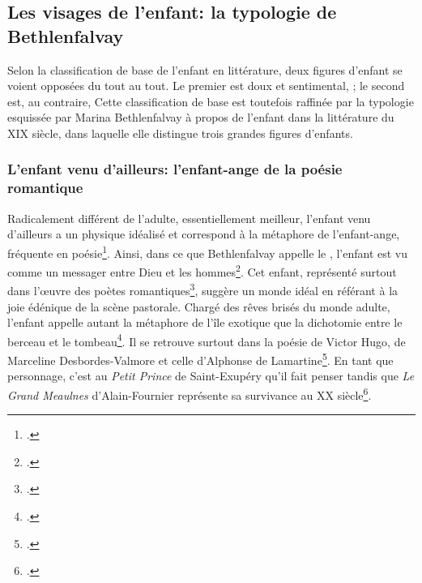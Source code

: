 \subsection{Les visages de l'enfant: la typologie de Bethlenfalvay} Selon la
classification de base de l'enfant en littérature, deux figures d'enfant se
voient opposées du tout au tout. Le premier est doux et sentimental, ; le second est, au contraire,
 Cette classification de
base est toutefois raffinée par la typologie esquissée par Marina Bethlenfalvay à
propos de l'enfant dans la littérature du XIX siècle, dans laquelle elle
distingue trois grandes figures d'enfants.

\subsubsection{L'enfant venu d'ailleurs: l'enfant-ange de la poésie romantique}
Radicalement différent de l'adulte, essentiellement meilleur, l'enfant venu
d'ailleurs a un physique idéalisé et correspond à la métaphore de l'enfant-ange,
fréquente en poésie\footcite[20]{Bethlenfalvay1979}. Ainsi, dans ce que
Bethlenfalvay appelle le , l'enfant est vu
comme un messager entre Dieu et les hommes\footcite[21-22]{Bethlenfalvay1979}.
Cet enfant, représenté surtout dans l'\oe{}uvre des poètes romantiques\footcite[19]{Bethlenfalvay1979}, suggère un monde idéal en référant à la joie édénique de la scène pastorale.
Chargé des rêves brisés du monde adulte, l'enfant appelle autant la métaphore de l'île exotique que la dichotomie entre le berceau et le tombeau\footcite[24-25, 33]{Bethlenfalvay1979}.
Il se retrouve surtout dans la poésie de Victor Hugo, de Marceline Desbordes-Valmore et celle d'Alphonse de Lamartine\footcite[19, 34]{Bethlenfalvay1979}.
En tant que personnage, c'est au \textit{Petit Prince} de Saint-Exupéry qu'il fait penser tandis que \textit{Le Grand Meaulnes} d'Alain-Fournier représente sa survivance au XX siècle\footcite[44-47]{Bethlenfalvay1979}.

